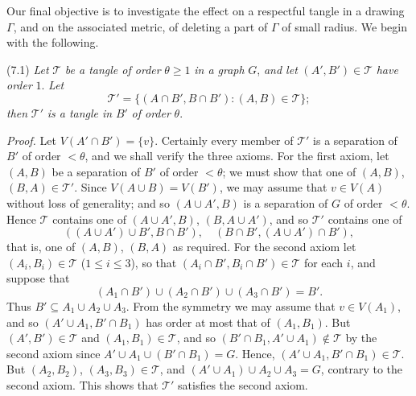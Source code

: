 
Our final objective is to investigate the effect on a respectful tangle in a drawing $\Gamma$, and on the associated metric, of deleting a part of $\Gamma$ of small radius. We begin with the following.

\stmt
(7.1) \textit{Let} $\mathscr{T}$ \textit{be a tangle of order} $\theta \ge 1$ \textit{in a graph} $G$, \textit{and let} $(A', B') \in \mathscr{T}$ \textit{have order} $1$. \textit{Let}
\begin{equation*}
\mathscr{T}' = \{(A \cap B', B \cap B') : (A, B) \in \mathscr{T}\};
\end{equation*}
\textit{then} $\mathscr{T}'$ \textit{is a tangle in} $B'$ \textit{of order} $\theta$.

\textit{Proof.} Let $V(A' \cap B') = \{v\}$. Certainly every member of $\mathscr{T}'$ is a separation of $B'$ of order $< \theta$, and we shall verify the three axioms. For the first axiom, let $(A, B)$ be a separation of $B'$ of order $< \theta$; we must show that one of $(A, B)$, $(B, A) \in \mathscr{T}'$. Since $V(A \cup B) = V(B')$, we may assume that $v \in V(A)$ without loss of generality; and so $(A \cup A', B)$ is a separation of $G$ of order $< \theta$. Hence $\mathscr{T}$ contains one of $(A \cup A', B)$, $(B, A \cup A')$, and so $\mathscr{T}'$ contains one of
\begin{equation*}
((A \cup A') \cup B', B \cap B'), \quad (B \cap B', (A \cup A') \cap B'),
\end{equation*}
that is, one of $(A, B)$, $(B, A)$ as required. For the second axiom let $(A_i, B_i) \in \mathscr{T}$ ($1 \le i \le 3$), so that $(A_i \cap B', B_i \cap B') \in \mathscr{T}$ for each $i$, and suppose that
\begin{equation*}
(A_1 \cap B') \cup (A_2 \cap B') \cup (A_3 \cap B') = B'.
\end{equation*}
Thus $B' \subseteq A_1 \cup A_2 \cup A_3$. From the symmetry we may assume that $v \in V(A_1)$, and so $(A' \cup A_1, B' \cap B_1)$ has order at most that of $(A_1, B_1)$. But $(A', B') \in \mathscr{T}$ and $(A_1, B_1) \in \mathscr{T}$, and so $(B' \cap B_1, A' \cup A_1) \notin \mathscr{T}$ by the second axiom since $A' \cup A_1 \cup (B' \cap B_1) = G$. Hence, $(A' \cup A_1, B' \cap B_1) \in \mathscr{T}$. But $(A_2, B_2)$, $(A_3, B_3) \in \mathscr{T}$, and $(A' \cup A_1) \cup A_2 \cup A_3 = G$, contrary to the second axiom. This shows that $\mathscr{T}'$ satisfies the second axiom.

